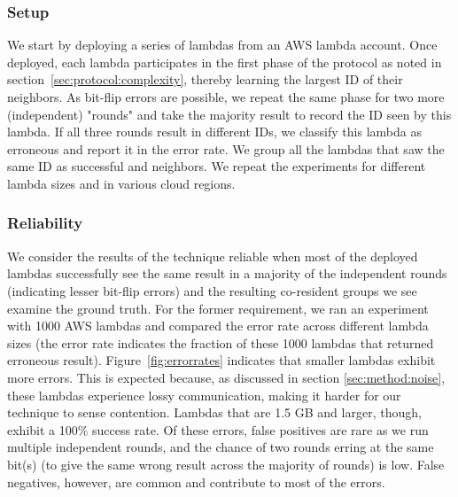 \subsubsection{Setup}
\label{subsec:expsetup}
We start by deploying a series of lambdas from an AWS lambda account.  Once
deployed, each lambda participates in the first phase of the protocol as noted
in section~\ref{sec:protocol:complexity}, thereby learning the largest ID of
their neighbors. As bit-flip errors are possible, we repeat the same phase for
two more (independent) "rounds" and take the majority result to record the ID
seen by this lambda.  If all three rounds result in different IDs, we classify
this lambda as erroneous and report it in the error rate. We group all the
lambdas that saw the same ID as successful and neighbors. We repeat the
experiments for different lambda sizes and in various cloud regions.

\subsubsection{Reliability}
We consider the results of the technique reliable when most of the deployed
lambdas successfully see the same result in a majority of the independent rounds
(indicating lesser bit-flip errors) and the resulting co-resident groups we
see examine the ground truth.  For the former requirement, 
we ran an experiment with 1000 AWS
lambdas and compared the error rate across different lambda sizes (the error
rate indicates the fraction of these 1000 lambdas that returned erroneous result).
Figure~\ref{fig:errorrates} 
indicates that smaller lambdas exhibit
more errors.  This is expected because, as discussed in section
\ref{sec:method:noise}, these lambdas experience lossy communication, making it
harder for our technique to sense contention. Lambdas that are 1.5 GB and
larger, though, exhibit a 100\% success rate. Of these errors, false positives are 
rare as we run multiple independent rounds, and the chance of two rounds erring at 
the same bit(s) (to give the same wrong result across the majority of rounds) is low. 
False negatives, however, are common and contribute to most of the errors.

